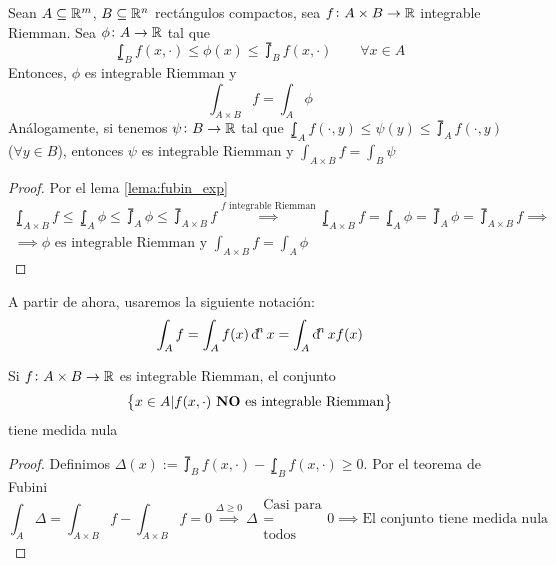\begin{teo}[de Fubini]
    Sean $A \subseteq \mathbb{R}^m$, $B \subseteq \mathbb{R}^n$ rectángulos compactos, sea
    $f \colon A \times B \to \mathbb{R}$ integrable Riemman. Sea $\phi \colon A \to \mathbb{R}$
    tal que
    \[
        \lowint_B f(x, \cdot) \leq \phi(x) \leq \upint_B f(x, \cdot) \qquad
        \forall x \in A
    \]
    Entonces, $\phi$ es integrable Riemman y
    \[
        \int_{A \times B} f = \int_A \phi
    \]
    Análogamente, si tenemos $\psi \colon B \to \mathbb{R}$ tal que $\lowint_A f(\cdot, y)
    \leq \psi(y) \leq \upint_A f(\cdot, y)$ ($\forall y \in B$), entonces $\psi$ es
    integrable Riemman y $\int_{A \times B} f = \int_B \psi$
\end{teo}

\begin{proof}
    Por el lema \ref{lema:fubin_exp}
    \begin{gather*}
        \lowint_{A \times B} f \leq \lowint_A \phi \leq \upint_A \phi \leq
        \upint_{A \times B} f \stackrel{f \text{ integrable Riemman}}{\implies}
        \lowint_{A \times B} f = \lowint_A \phi = \upint_A \phi = \upint_{A \times B} f
        \implies \\ \implies \phi \text{ es integrable Riemman y } \int_{A \times B} f
        = \int_A \phi
    \end{gather*}
\end{proof}
\begin{obs*}
    A partir de ahora, usaremos la siguiente notación:
    \[
        \int_A f = \int_A f(x) \dif^n x = \int_A \dif^n x f(x)
    \]
\end{obs*}

\begin{obs}
    Si $f \colon A \times B \to \mathbb{R}$ es integrable Riemman, el conjunto
    \[
        \left\{x \in A \vert f(x, \cdot) \text{ \textbf{NO} es integrable Riemman}\right\}
    \]
    tiene medida nula
\end{obs}

\begin{proof}
    Definimos $\Delta(x) := \upint_B f(x, \cdot) - \lowint_B f(x, \cdot) \geq 0$. Por
    el teorema de Fubini
    \[
        \int_A \Delta = \int_{A \times B} f - \int_{A \times B} f = 0
        \stackrel{\Delta \geq 0}{\implies} \Delta \substack{\text{Casi para} \\ = \\
        \text{todos}} 0 \implies \text{El conjunto tiene medida nula}
    \]
\end{proof}

